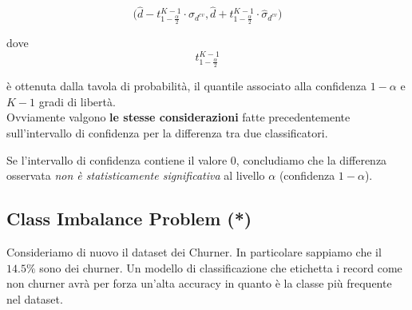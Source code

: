 \[\biggl( \hat{d} - t_{1-\frac{\alpha}{2}}^{K-1} \cdot \hat{\sigma}_{d^{cv}}
,
\hat{d} + t_{1-\frac{\alpha}{2}}^{K-1} \cdot \hat{\sigma}_{d^{cv}} \biggr)\]

dove 
\[t_{1-\frac{\alpha}{2}}^{K-1}\]

è ottenuta dalla tavola di probabilità, il quantile associato alla confidenza $1-\alpha$ e $K-1$ gradi di libertà.\\

Ovviamente valgono \textbf{le stesse considerazioni} fatte precedentemente sull'intervallo di confidenza per la differenza tra due classificatori. 

Se l'intervallo di confidenza contiene il valore 0, concludiamo che la differenza osservata \textit{non è statisticamente significativa} al livello $\alpha$ (confidenza $1-\alpha$). 

\subsection{Class Imbalance Problem (*)}
Consideriamo di nuovo il dataset dei Churner. In particolare sappiamo che il $14.5\%$ sono dei churner. Un modello di classificazione che etichetta i record come non churner avrà per forza un'alta accuracy in quanto è la classe più frequente nel dataset. 

